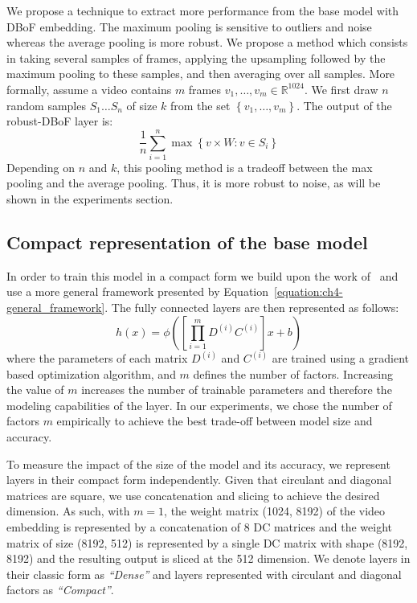 We propose a technique to extract more performance from the base model with DBoF embedding.
The maximum pooling is sensitive to outliers and noise whereas the average pooling is more robust.
We propose a method which consists in taking several samples of frames, applying the upsampling followed by the maximum pooling to these samples, and then averaging over all samples.
More formally, assume a video contains $m$ frames $v_{1},\ldots,v_{m}\in\mathbb{R}^{1024}$.
We first draw $n$ random samples $S_{1}\ldots S_{n}$ of size $k$ from the set $\left\{ v_{1},\ldots,v_{m}\right\} $.
The output of the robust-DBoF layer is:
\begin{equation}
  \frac{1}{n}\sum_{i=1}^{n}\max\left\{ v\times W:v\in S_{i}\right\} 
\end{equation}
\noindent
Depending on $n$ and $k$, this pooling method is a tradeoff between the max pooling and the average pooling.
Thus, it is more robust to noise, as will be shown in the experiments section.


\subsection{Compact representation of the base model}
\label{subsection:ch4-compact}

In order to train this model in a compact form we build upon the work of~\cite{cheng2015exploration} and use a more general framework presented by  Equation~\ref{equation:ch4-general_framework}.
The fully connected layers are then represented as follows:
\begin{equation}
  h(x) = \phi\left(\left[\prod_{i=1}^{m} D^{(i)} C^{(i)}\right]x + b\right)
\end{equation}
where the parameters of each matrix $D^{(i)}$ and $C^{(i)}$ are trained using a gradient based optimization algorithm, and $m$ defines the number of factors.
Increasing the value of $m$ increases the number of trainable parameters and therefore the modeling capabilities of the layer.
In our experiments, we chose the number of factors $m$ empirically to achieve the best trade-off between model size and accuracy.

To measure the impact of the size of the model and its accuracy, we represent layers in their compact form independently.
Given that circulant and diagonal matrices are square, we use concatenation and slicing to achieve the desired dimension.
As such, with $m=1$, the weight matrix (1024, 8192) of the video embedding is represented by a concatenation of 8 DC matrices and the weight matrix of size (8192, 512) is represented by a single DC matrix with shape (8192, 8192) and the resulting output is sliced at the 512 dimension.
We denote layers in their classic form as \emph{``Dense''} and layers represented with circulant and diagonal factors as \emph{``Compact''}.

